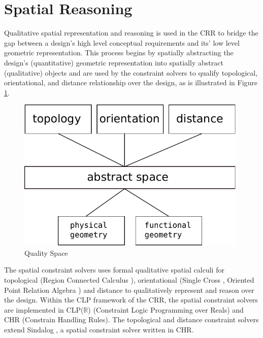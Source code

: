\documentclass[12pt]{ucthesis}
\begin{document}
\section{Spatial Reasoning}
Qualitative spatial representation and reasoning is used in the CRR to bridge the gap between a design's high level conceptual requirements and its' low level geometric representation. This process begins by spatially abstracting the design's (quantitative) geometric representation into spatially abstract (qualitative) objects and are used by the constraint solvers to qualify topological, orientational, and distance relationship over the design, as is illustrated in Figure \ref{reasoner-design}. 

\begin{figure}[H]
\centering
\includegraphics[width=110mm]{reasoner-design}
\caption{Quality Space}
\label{reasoner-design}
\end{figure}

The spatial constraint solvers uses formal qualitative spatial calculi for topological (Region Connected Calculus \cite{Freksa}), orientational (Single Cross \cite{Freksa}, Oriented Point Relation Algebra \cite{Moratz}) and distance to qualitatively represent and reason over the design. Within the CLP framework of the CRR, the spatial constraint solvers are implemented in CLP($\mathbb{R}$) (Constraint Logic Programming over Reals) and CHR (Constrain Handling Rules). The topological and distance constraint solvers extend Sindalog \cite{Sindalog}, a spatial constraint solver written in CHR.
\end{document}
